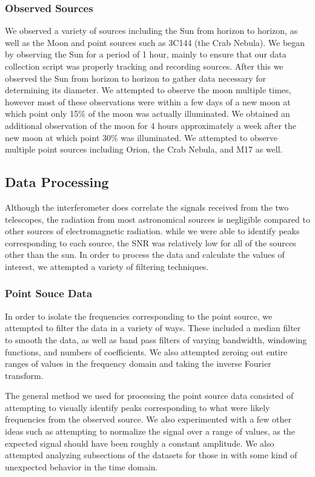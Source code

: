 \documentclass{article}
\begin{document}
  \subsubsection{Observed Sources}
  We observed a variety of sources including the Sun from horizon to horizon, as
  well as the Moon and point sources such as 3C144 (the Crab Nebula). We began
  by observing the Sun for a period of 1 hour, mainly to ensure that our data
  collection script was properly tracking and recording sources. After this we
  observed the Sun from horizon to horizon to gather data necessary for
  determining its diameter. We attempted to observe the moon multiple times,
  however most of these observations were within a few days of a new moon at
  which point only 15\% of the moon was actually illuminated. We obtained
  an additional observation of the moon for 4 hours approximately a week after
  the new moon at which point 30\% was illuminated. We attempted to observe
  multiple point sources including Orion, the Crab Nebula, and M17 as well.

  \subsection{Data Processing}
  Although the interferometer does correlate the signals received from the two
  telescopes, the radiation from most astronomical sources is negligible
  compared to other sources of electromagnetic radiation. while we were able to
  identify peaks corresponding to each source, the SNR was relatively low for
  all of the sources other than the sun. In order to process the data and
  calculate the values of interest, we attempted a variety of filtering
  techniques.

  \subsubsection{Point Souce Data}
  In order to isolate the frequencies corresponding to the point source, we
  attempted to filter the data in a variety of ways. These included a median
  filter to smooth the data, as well as band pass filters of varying bandwidth,
  windowing functions, and numbers of coefficients. We also attempted zeroing
  out entire ranges of values in the frequency domain and taking the inverse
  Fourier transform.

  The general method we used for processing the point source data consisted of
  attempting to visually identify peaks corresponding to what were likely
  frequencies from the observed source. We also experimented with a few other
  ideas such as attempting to normalize the signal over a range of values, as
  the expected signal should have been roughly a constant amplitude. We also
  attempted analyzing subsections of the datasets for those in with some kind of
  unexpected behavior in the time domain.
\end{document}
